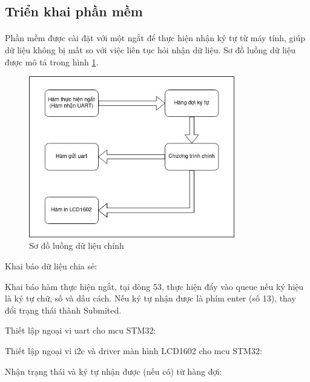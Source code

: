 \subsection{Triển khai phần mềm}
\paragraph{}
Phần mềm được cài đặt với một ngắt để thực hiện nhận ký tự từ máy tính, giúp dữ liệu không bị mất so với việc liên tục hỏi nhận dữ liệu. Sơ đồ luồng dữ liệu được mô tả trong hình \ref{fig:data-flow}.

\begin{figure}[H]
	\centering
	\includegraphics[width=0.8\textwidth]{images/arm-co-ban-data-flow.jpg}
	\caption{Sơ đồ luồng dữ liệu chính}
	\label{fig:data-flow}
\end{figure}

Khai báo dữ liệu chia sẻ:


Khai báo hàm thực hiện ngắt, tại dòng 53, thực hiện đẩy vào queue nếu ký hiệu là ký tự chữ, số và dấu cách. Nếu ký tự nhận được là phím enter (số 13), thay đổi trạng thái thành Submited.


Thiết lập ngoại vi \acrshort{uart} cho \acrshort{mcu} STM32:


Thiết lập ngoại vi \acrshort{i2c} và driver màn hình LCD1602 cho \acrshort{mcu} STM32:


Nhận trạng thái và ký tự nhận được (nếu có) từ hàng đợi:


